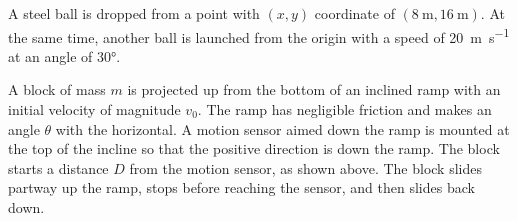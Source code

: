 \documentclass{../../../oss-classkick-exam}
\begin{document}
\begin{questions}
\begin{center}
  \end{center}
  \newpage

  \question A steel ball is dropped from a point with $(x,y)$ coordinate of
  $(\SI{8}{\metre},\SI{16}{\metre})$. At the same time, another ball is launched
  from the origin with a speed of \SI{20}{\metre\per\second} at an angle of
  \ang{30}.
  \newpage


  \question A block of mass $m$ is projected up from the bottom of an inclined
  ramp with an initial velocity of magnitude $v_0$. The ramp has negligible
  friction and makes an angle $\theta$ with the horizontal. A motion sensor
  aimed down the ramp is mounted at the top of the incline so that the positive
  direction is down the ramp. The block starts a distance $D$ from the motion
  sensor, as shown above. The block slides partway up the ramp, stops before
  reaching the sensor, and then slides back down.
\end{questions}
\end{document}
